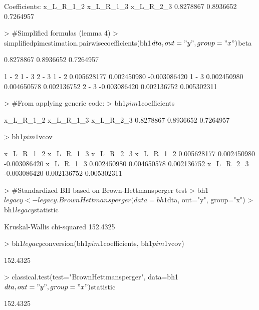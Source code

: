 \documentclass[12pt]{article}
\begin{document}
\begin{Schunk}
\begin{Soutput}
Coefficients:
x_L_R_1_2 x_L_R_1_3 x_L_R_2_3 
0.8278867 0.8936652 0.7264957 
\end{Soutput}
\begin{Sinput}
> 	#Simplified formulas (lemma 4)
> 	simplifiedpimestimation.pairwisecoefficients(bh1$dta, out="y", group="x")$beta
\end{Sinput}
\begin{Soutput}
[1] 0.8278867 0.8936652 0.7264957
\end{Soutput}
\begin{Soutput}
             1 - 2       1 - 3        2 - 3
1 - 2  0.005628177 0.002450980 -0.003086420
1 - 3  0.002450980 0.004650578  0.002136752
2 - 3 -0.003086420 0.002136752  0.005302311
\end{Soutput}
\begin{Sinput}
> 	#From applying generic code:
> 	bh1$pim1$coefficients
\end{Sinput}
\begin{Soutput}
x_L_R_1_2 x_L_R_1_3 x_L_R_2_3 
0.8278867 0.8936652 0.7264957 
\end{Soutput}
\begin{Sinput}
> 	bh1$pim1$vcov
\end{Sinput}
\begin{Soutput}
             x_L_R_1_2   x_L_R_1_3    x_L_R_2_3
x_L_R_1_2  0.005628177 0.002450980 -0.003086420
x_L_R_1_3  0.002450980 0.004650578  0.002136752
x_L_R_2_3 -0.003086420 0.002136752  0.005302311
\end{Soutput}
\begin{Sinput}
> 	#Standardized BH based on Brown-Hettmansperger test
> 	bh1$legacy<-legacy.BrownHettmansperger(data=bh1$dta, out="y", group="x")
> 	bh1$legacy$statistic
\end{Sinput}
\begin{Soutput}
Kruskal-Wallis chi-squared 
                  152.4325 
\end{Soutput}
\begin{Sinput}
> 	bh1$legacy$conversion(bh1$pim1$coefficients, bh1$pim1$vcov)
\end{Sinput}
\begin{Soutput}
         [,1]
[1,] 152.4325
\end{Soutput}
\begin{Sinput}
> 	classical.test(test="BrownHettmansperger", data=bh1$dta, out="y", group="x")$statistic
\end{Sinput}
\begin{Soutput}
         [,1]
[1,] 152.4325
\end{Soutput}
\end{Schunk}
\end{document}

